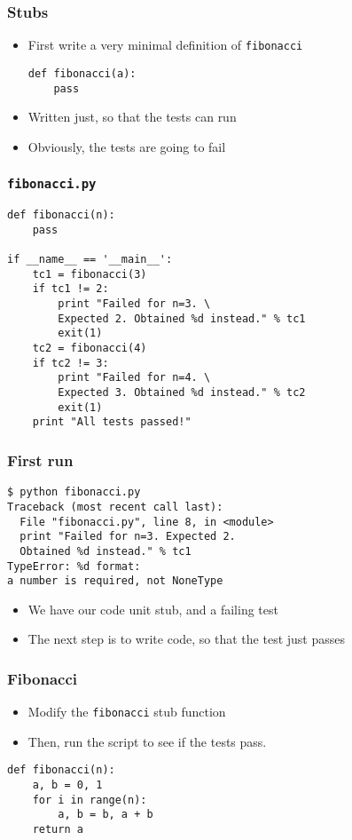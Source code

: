 \documentclass[17pt,compress]{beamer}
\begin{document}
\begin{frame}[fragile]
  \frametitle{Stubs}
  \begin{itemize}
  \item First write a very minimal definition of \texttt{fibonacci}
    \begin{lstlisting}
def fibonacci(a):
    pass
    \end{lstlisting}
  \item Written just, so that the tests can run
  \item Obviously, the tests are going to fail
  \end{itemize}
\end{frame}
\begin{frame}[fragile]
  \frametitle{\texttt{fibonacci.py}}
\tiny
{
\begin{lstlisting}
def fibonacci(n):
    pass

if __name__ == '__main__':
    tc1 = fibonacci(3)
    if tc1 != 2:
        print "Failed for n=3. \
        Expected 2. Obtained %d instead." % tc1
        exit(1)
    tc2 = fibonacci(4)
    if tc2 != 3:
        print "Failed for n=4. \
        Expected 3. Obtained %d instead." % tc2
        exit(1)
    print "All tests passed!"
\end{lstlisting}
}
\end{frame}
\begin{frame}[fragile]
  \frametitle{First run}
\small
{
\begin{lstlisting}
$ python fibonacci.py
Traceback (most recent call last):
  File "fibonacci.py", line 8, in <module> 
  print "Failed for n=3. Expected 2. 
  Obtained %d instead." % tc1
TypeError: %d format: 
a number is required, not NoneType
\end{lstlisting} %
}
  \begin{itemize}
  \item We have our code unit stub, and a failing test
  \item The next step is to write code, so that the test just passes
  \end{itemize}
\end{frame}
\begin{frame}[fragile]
  \frametitle{Fibonacci}
  \begin{itemize}
  \item Modify the \texttt{fibonacci} stub function
  \item Then, run the script to see if the tests pass.
  \end{itemize}
\small
{
\begin{lstlisting}
def fibonacci(n):
    a, b = 0, 1
    for i in range(n):
        a, b = b, a + b
    return a

\end{lstlisting}
\begin{lstlisting}
\end{lstlisting} %
}
\end{frame}
\end{document}
